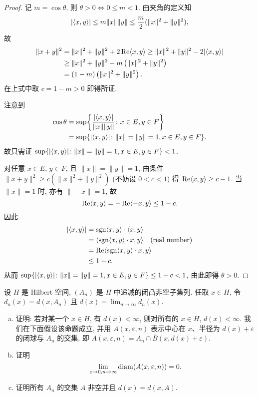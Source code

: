 \begin{proof}
    \necessary
    记 $m=\cos\theta$, 则 $\theta>0\iff 0\leq m<1$. 由夹角的定义知
    \[|\langle x,y\rangle|\leq m\|x\|\|y\|\leq\frac{m}{2}(\|x\|^2+\|y\|^2),\]
    故
    \begin{align*}
        \|x+y\|^2
        & = \|x\|^2+\|y\|^2+2\operatorname{Re}\langle x,y\rangle\geq \|x\|^2+\|y\|^2-2|\langle x,y\rangle| \\
        & \geq \|x\|^2+\|y\|^2-m\left(\|x\|^2+\|y\|^2\right) \\
        & = (1-m)\left(\|x\|^2+\|y\|^2\right).
    \end{align*}
    在上式中取 $c=1-m>0$ 即得所证.

    \sufficient
    注意到
    \begin{align*}
        \cos\theta
        & =\sup\biggl\{\frac{|\langle x,y\rangle|}{\|x\|\|y\|}\colon x\in E,y\in F\biggr\} \\
        & =\sup\{|\langle x,y\rangle|\colon \|x\|=\|y\|=1,x\in E,y\in F\}.
    \end{align*}
    故只需证 $\sup\{|\langle x,y\rangle|\colon \|x\|=\|y\|=1,x\in E,y\in F\}<1$.

    对任意 $x\in E$, $y\in F$, 且 $\|x\|=\|y\|=1$, 由条件 $\|x+y\|^2\geq c(\|x\|^2+\|y\|^2)$
    (不妨设 $0<c<1$) 得 $\operatorname{Re}\langle x,y\rangle\geq c-1$.
    当 $\|x\|=1$ 时, 亦有 $\|-x\|=1$, 故
    \[\operatorname{Re}\langle x,y\rangle=-\operatorname{Re}\langle-x,y\rangle\leq 1-c.\]
    因此
    \begin{align*}
        |\langle x,y\rangle|
        & =\operatorname{sgn}\langle x,y\rangle\cdot\langle x,y\rangle \\
        & =\langle\operatorname{sgn}\langle x,y\rangle\cdot x,y\rangle\quad(\text{real number})\\
        & =\operatorname{Re}\langle\operatorname{sgn}\langle x,y\rangle\cdot x,y\rangle \\
        & \leq 1-c.
    \end{align*}
    从而 $\sup\{|\langle x,y\rangle|\colon \|x\|=\|y\|=1,x\in E,y\in F\}\leq 1-c<1$, 由此即得 $\theta>0$.
\end{proof}



\begin{exercise}
    设 $H$ 是 Hilbert 空间, $(A_n)$ 是 $H$ 中递减的闭凸非空子集列. 
    任取 $x\in H$, 令 $d_n(x)=d(x,A_n)$ 且 $d(x)=\lim_{n\to\infty}d_n(x)$.
    \begin{enumerate}[(a)]
    \item 证明: 若对某一个 $x\in H$, 有 $d(x)<\infty$, 
    则对所有的 $x\in H$, $d(x)<\infty$. 我们在下面假设该命题成立, 
    并用 $A(x,\varepsilon,n)$ 表示中心在 $x$、半径为 $d(x)+\varepsilon$ 的闭球与 $A_n$ 的交集, 
    即 $A(x,\varepsilon,n)=A_n\cap\overline{B}(x,d(x)+\varepsilon)$.
    \item 证明
    \[\lim_{\varepsilon\to 0,n\to\infty}\operatorname{diam}(A(x,\varepsilon,n))=0.\]
    \item 证明所有 $A_n$ 的交集 $A$ 非空并且 $d(x)=d(x,A)$.
    \end{enumerate}
\end{exercise}

